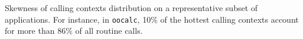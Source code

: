\label{fig:hcct-skewness} Skewness of calling contexts distribution on a representative subset of applications. For instance, in {\tt oocalc}, 10\% of the hottest calling contexts account for more than 86\% of all routine calls.
